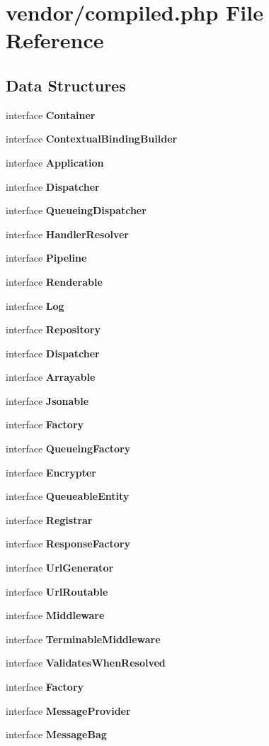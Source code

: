\section{vendor/compiled.php File Reference}
\label{compiled_8php}
\subsection*{Data Structures}
\begin{DoxyCompactItemize}
\item 
interface {\bf Container}
\item 
interface {\bf Contextual\+Binding\+Builder}
\item 
interface {\bf Application}
\item 
interface {\bf Dispatcher}
\item 
interface {\bf Queueing\+Dispatcher}
\item 
interface {\bf Handler\+Resolver}
\item 
interface {\bf Pipeline}
\item 
interface {\bf Renderable}
\item 
interface {\bf Log}
\item 
interface {\bf Repository}
\item 
interface {\bf Dispatcher}
\item 
interface {\bf Arrayable}
\item 
interface {\bf Jsonable}
\item 
interface {\bf Factory}
\item 
interface {\bf Queueing\+Factory}
\item 
interface {\bf Encrypter}
\item 
interface {\bf Queueable\+Entity}
\item 
interface {\bf Registrar}
\item 
interface {\bf Response\+Factory}
\item 
interface {\bf Url\+Generator}
\item 
interface {\bf Url\+Routable}
\item 
interface {\bf Middleware}
\item 
interface {\bf Terminable\+Middleware}
\item 
interface {\bf Validates\+When\+Resolved}
\item 
interface {\bf Factory}
\item 
interface {\bf Message\+Provider}
\item 
interface {\bf Message\+Bag}

\end{DoxyCompactItemize}
